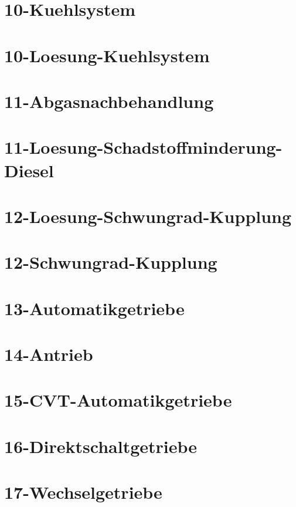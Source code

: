 \chapter{10-Kuehlsystem}
%
\chapter{10-Loesung-Kuehlsystem}
%
\chapter{11-Abgasnachbehandlung}
%
\chapter{11-Loesung-Schadstoffminderung-Diesel}
%
\chapter{12-Loesung-Schwungrad-Kupplung}
%
\chapter{12-Schwungrad-Kupplung}
%
\chapter{13-Automatikgetriebe}
%
\chapter{14-Antrieb}
%
\chapter{15-CVT-Automatikgetriebe}
%
\chapter{16-Direktschaltgetriebe}
%
\chapter{17-Wechselgetriebe}
%
